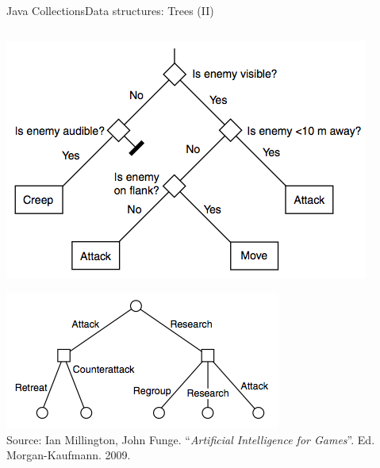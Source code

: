 \documentclass[10pt,compress]{beamer} %
\begin{document}
\begin{frame}{Java Collections}{Data structures: Trees (II)}
    \begin{columns}
	   	\begin{center}
		\vspace{-0.2cm}
		\includegraphics[width=0.9\linewidth]{figs/tree4.png}

		\bigskip

		\vspace{-0.2cm}
		\includegraphics[width=0.9\linewidth]{figs/tree5.png}\\
		\tiny
		Source: Ian Millington, John Funge. ``\textit{Artificial Intelligence for Games}''. Ed. Morgan-Kaufmann. 2009.
		\end{center}


\end{columns}
\end{frame}
\end{document}
